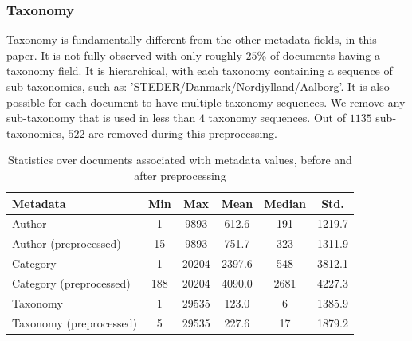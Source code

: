 \subsubsection{Taxonomy}\label{subsec:appendix_taxonomy}
Taxonomy is fundamentally different from the other metadata fields, in this paper.
It is not fully observed with only roughly $25\%$ of documents having a taxonomy field.
It is hierarchical, with each taxonomy containing a sequence of sub-taxonomies, such as: 'STEDER/Danmark/Nordjylland/Aalborg'.
It is also possible for each document to have multiple taxonomy sequences.
We remove any sub-taxonomy that is used in less than $4$ taxonomy sequences.
Out of $1135$ sub-taxonomies, $522$ are removed during this preprocessing.

\begin{table}
	\centering
	\begin{tabular}{l | c | c | c | c | c}
		Metadata & Min & Max & Mean & Median & Std. \\
		\hline
		Author & 1 & 9893 & 612.6 & 191 & 1219.7 \\
		Author (preprocessed) & 15 & 9893 & 751.7 & 323 & 1311.9 \\
		Category & 1 & 20204 & 2397.6 & 548 & 3812.1 \\
		Category (preprocessed) & 188 & 20204 & 4090.0 & 2681 & 4227.3 \\
		Taxonomy & 1 & 29535 & 123.0 & 6 & 1385.9 \\
		Taxonomy (preprocessed) & 5 & 29535 & 227.6 & 17 & 1879.2 \\
	\end{tabular}
	\caption{Statistics over documents associated with metadata values, before and after preprocessing}
	\label{tab:meta_prepro_stats}
\end{table}
